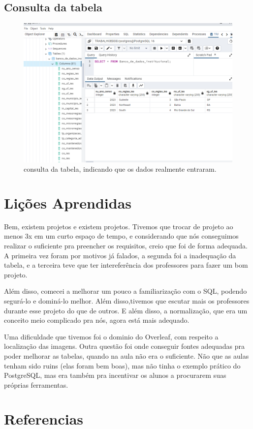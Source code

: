 \documentclass[12pt]{article}
\begin{document}
\subsection{Consulta da tabela}
\cite{aulasSQL}
\begin{figure}[h!]
\centering
\includegraphics[width=1\textwidth]{consulta da tabela de BDD.PNG}
\caption{consulta da tabela, indicando que os dados realmente entraram.}

\end{figure}


\section{Lições Aprendidas}

Bem, existem projetos e existem projetos. Tivemos que trocar de projeto ao menos 3x em um curto espaço de tempo, e considerando que nós conseguimos realizar o suficiente pra preencher os requisitos, creio que foi de forma adequada. A primeira vez foram por motivos já falados, a segunda foi a inadequação da tabela, e a terceira teve que ter intereferência dos professores para fazer um bom projeto.

Além disso, comecei a melhorar um pouco a familiarização com o SQL, podendo segurá-lo e dominá-lo melhor. Além disso,tivemos que escutar mais os professores durante esse projeto do que de outros. E além disso, a normalização, que era um conceito meio complicado pra nós, agora está mais adequado.

Uma dificuldade que tivemos foi o dominio do Overleaf, com respeito a localização das imagens. Outra questão foi onde conseguir fontes adequadas pra poder melhorar as tabelas, quando na aula não era o suficiente. Não que as aulas tenham sido ruins (elas foram bem boas), mas não tinha o exemplo prático do PostgreSQL, mas era também pra incentivar os alunos a procurarem suas próprias ferramentas.

\section{Referencias}




\end{document}
